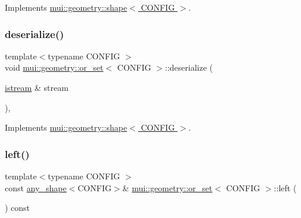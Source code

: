 Implements \hyperlink{classmui_1_1geometry_1_1shape_a4d1307ebc40d462b13da89c811b3beb7}{mui\+::geometry\+::shape$<$ C\+O\+N\+F\+I\+G $>$}.

\mbox{\label{classmui_1_1geometry_1_1or__set_ad08aaf634078ee8407ab86de77576391}} 
\subsubsection{\texorpdfstring{deserialize()}{deserialize()}}
{\footnotesize\ttfamily template$<$typename C\+O\+N\+F\+IG $>$ \\
void \hyperlink{classmui_1_1geometry_1_1or__set}{mui\+::geometry\+::or\+\_\+set}$<$ C\+O\+N\+F\+IG $>$\+::deserialize (\begin{DoxyParamCaption}\item[{\hyperlink{classmui_1_1istream}{istream} \&}]{stream }\end{DoxyParamCaption})\hspace{0.3cm}{\ttfamily [inline]}, {\ttfamily [virtual]}}



Implements \hyperlink{classmui_1_1geometry_1_1shape_ae68c7e1a1ae362abec52edad5489a1a9}{mui\+::geometry\+::shape$<$ C\+O\+N\+F\+I\+G $>$}.

\mbox{\label{classmui_1_1geometry_1_1or__set_a143434f556a636e3c8ea7bc71cca5286}} 
\subsubsection{\texorpdfstring{left()}{left()}\hspace{0.1cm}{\footnotesize\ttfamily [1/2]}}
{\footnotesize\ttfamily template$<$typename C\+O\+N\+F\+IG $>$ \\
const \hyperlink{classmui_1_1geometry_1_1any__shape}{any\+\_\+shape}$<$C\+O\+N\+F\+IG$>$\& \hyperlink{classmui_1_1geometry_1_1or__set}{mui\+::geometry\+::or\+\_\+set}$<$ C\+O\+N\+F\+IG $>$\+::left (\begin{DoxyParamCaption}{ }\end{DoxyParamCaption}) const\hspace{0.3cm}{\ttfamily [inline]}}

